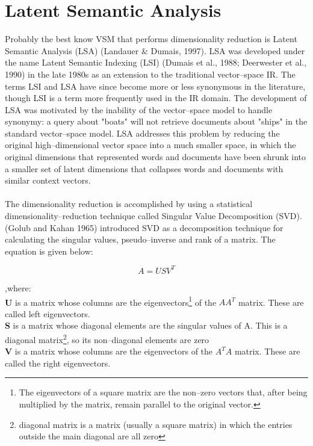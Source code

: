 \section{Latent Semantic Analysis}\label{LSA}
Probably the best know VSM that performs dimensionality reduction is Latent Semantic Analysis (LSA) 
(Landauer \& Dumais, 1997). LSA was developed under the name Latent Semantic 
Indexing (LSI) (Dumais et al., 1988; Deerwester et al., 
1990) in the late 1980s as an extension to the traditional 
vector--space IR. The terms LSI and LSA have since become  more or less synonymous in the literature, 
though LSI is a term more frequently used in the IR domain. The development of LSA was motivated by 
the inability of the vector--space model to handle synonymy: a query about "boats" will not retrieve 
documents about "ships" in the standard vector--space model. LSA addresses this problem by reducing 
the original high--dimensional vector space into a much smaller space, in which the original dimensions 
that represented words and documents have been shrunk into a smaller set of latent dimensions that 
collapses words and documents with similar context vectors.
\\\\
The dimensionality reduction is accomplished by using a statistical dimensionality--reduction technique 
called Singular Value Decomposition (SVD). (Golub and Kahan 1965) introduced 
SVD as a decomposition technique for calculating the singular values, pseudo--inverse and rank of a 
matrix. The equation is given below:
\begin{center} 
\begin{equation}
 A = USV^{T}
\end{equation}
\end{center}
,where: 
\\\textbf{U} is a matrix whose columns are the eigenvectors\footnote{The eigenvectors of a square matrix 
are the non--zero vectors that, after being multiplied by the matrix, remain parallel to the original vector.} 
of the $AA^{T}$ matrix. These are called left eigenvectors.
\\\textbf{S} is a matrix whose diagonal elements are the singular values of A. This is a diagonal 
matrix\footnote{diagonal matrix is a matrix (usually a square matrix) in which the entries outside the main 
diagonal are all zero}, so its non--diagonal elements are zero
\\\textbf{V} is a matrix whose columns are the eigenvectors of the $A^{T}A$  matrix. These are called 
the right eigenvectors.
